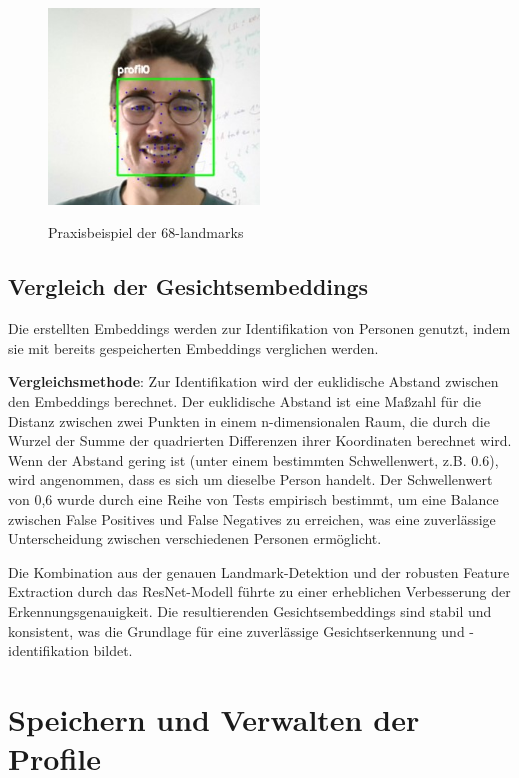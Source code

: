 \begin{figure}[h!]
    \centering
    \includegraphics[width=0.5\textwidth]{pictures/68landmarks.jpg}
    \caption{Praxisbeispiel der 68-landmarks}
    \label{fig:68landmarks}
    \cite{68landmarks}
\end{figure}

\subsection{Vergleich der Gesichtsembeddings}
Die erstellten Embeddings werden zur Identifikation von Personen genutzt, indem sie mit bereits gespeicherten Embeddings verglichen werden. 

\textbf{Vergleichsmethode}:
Zur Identifikation wird der euklidische Abstand zwischen den Embeddings berechnet. Der euklidische Abstand ist eine Maßzahl für die Distanz zwischen zwei Punkten in einem n-dimensionalen Raum, die durch die Wurzel der Summe der quadrierten Differenzen ihrer Koordinaten berechnet wird. Wenn der Abstand gering ist (unter einem bestimmten Schwellenwert, z.B. 0.6), wird angenommen, dass es sich um dieselbe Person handelt. Der Schwellenwert von 0,6 wurde durch eine Reihe von Tests empirisch bestimmt, um eine Balance zwischen False Positives und False Negatives zu erreichen, was eine zuverlässige Unterscheidung zwischen verschiedenen Personen ermöglicht.

Die Kombination aus der genauen Landmark-Detektion und der robusten Feature Extraction durch das ResNet-Modell führte zu einer erheblichen Verbesserung der Erkennungsgenauigkeit. Die resultierenden Gesichtsembeddings sind stabil und konsistent, was die Grundlage für eine zuverlässige Gesichtserkennung und -identifikation bildet.

\section{Speichern und Verwalten der Profile}

